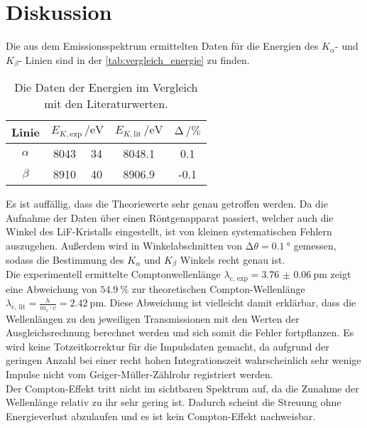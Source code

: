 \section{Diskussion}
\label{sec:Diskussion}

Die aus dem Emissionsspektrum ermittelten Daten für die Energien des $K_{\alpha}$- und $K_{\beta}$- Linien sind in der \autoref{tab:vergleich_energie} zu finden. 

\begin{table}[H]
    \centering
    \caption{Die Daten der Energien im Vergleich mit den Literaturwerten.}
    \label{tab:vergleich_energie}
    \begin{tabular}{c c @{${} \pm {}$} c c c}
        \toprule
        Linie & \multicolumn{2}{c}{$E_{K, \text{exp}} \, / \si{\electronvolt}$ } & $E_{K, \text{lit}} \, / \si{\electronvolt} $  & $\increment  \, / \si{\percent}$ \\
        \midrule
        $\alpha$ &  8043 & 34 & 8048.1 & 0.1 \\
        $\beta $  &  8910 & 40 & 8906.9 & -0.1 \\
        \bottomrule
    \end{tabular}
\end{table}

\noindent Es ist auffällig, dass die Theoriewerte sehr genau getroffen werden. Da die Aufnahme der Daten über einen Röntgenapparat passiert, welcher auch die 
Winkel des LiF-Kristalls eingestellt, ist von kleinen systematischen Fehlern auszugehen. Außerdem wird in Winkelabschnitten von $\increment \theta = \SI{0.1}{\degree}$ 
gemessen, sodass die Bestimmung des $K_{\alpha}$ und $K_{\beta}$ Winkels recht genau ist. \\


\noindent Die experimentell ermittelte Comptonwellenlänge $\lambda_{\text{c, exp}} = \SI{3.76(6)}{\pico\metre}$ zeigt eine Abweichung von $ \SI{54.9}{\percent}$
zur theoretischen Compton-Wellenlänge $\lambda_{\text{c, lit}} = \frac{h}{m_e \cdot c} = \SI{2.42}{\pico\metre}$. Diese Abweichung ist vielleicht damit erklärbar, 
dass die Wellenlängen zu den jeweiligen Transmissionen mit den Werten der Ausgleichsrechnung berechnet werden und sich somit die Fehler fortpflanzen. 
Es wird keine Totzeitkorrektur für die Impulsdaten gemacht, da aufgrund der geringen Anzahl bei einer recht hohen Integrationszeit wahrscheinlich sehr wenige
Impulse nicht vom Geiger-Müller-Zählrohr registriert werden. \\
Der Compton-Effekt tritt nicht im sichtbaren Spektrum auf, da die Zunahme der Wellenlänge relativ zu ihr sehr gering ist. Dadurch scheint die Streuung ohne
Energieverlust abzulaufen und es ist kein Compton-Effekt nachweisbar. 